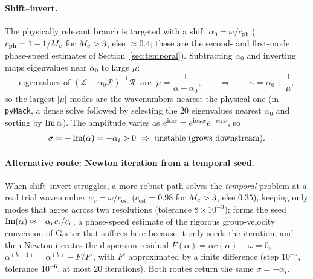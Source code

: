 \documentclass[11pt]{article}
\begin{document}
\paragraph{Shift--invert.} The physically relevant branch is targeted with a shift
$\alpha_0=\omega/c_{\mathrm{ph}}$ ($c_{\mathrm{ph}}=1-1/M_e$ for $M_e>3$, else $\approx0.4$;
these are the second- and first-mode phase-speed estimates of Section~\ref{sec:temporal}). Subtracting
$\alpha_0$ and inverting maps eigenvalues near $\alpha_0$ to large $\mu$:
\begin{equation}\label{eq:shift}
  \text{eigenvalues of }(\mathcal L-\alpha_0\mathcal R)^{-1}\mathcal R\ \text{ are }\ \mu=\frac1{\alpha-\alpha_0},
  \qquad\Rightarrow\qquad \alpha=\alpha_0+\frac1\mu ,
\end{equation}
so the largest-$|\mu|$ modes are the wavenumbers nearest the physical one (in \texttt{pyMack}, a
dense solve followed by selecting the $20$ eigenvalues nearest $\alpha_0$ and
sorting by $\operatorname{Im}\alpha$). The amplitude varies as
$e^{\mathrm{i}\alpha x}=e^{\mathrm{i}\alpha_rx}e^{-\alpha_ix}$, so
\begin{equation}\label{eq:sgrowth}
  \sigma=-\operatorname{Im}(\alpha)=-\alpha_i>0\ \Rightarrow\ \text{unstable (grows downstream)}.
\end{equation}

\paragraph{Alternative route: Newton iteration from a temporal seed.} When shift--invert struggles, a
more robust path solves the \emph{temporal} problem at a
real trial wavenumber $\alpha_r=\omega/c_{\mathrm{est}}$ ($c_{\mathrm{est}}=0.98$ for $M_e>3$, else
$0.35$), keeping only modes that agree across two resolutions (tolerance $8\times10^{-3}$); forms the
seed $\operatorname{Im}(\alpha)\approx-\alpha_rc_i/c_r$, a phase-speed estimate of the rigorous
group-velocity conversion of Gaster \cite{gaster1962} that suffices here because it only seeds the
iteration, and then Newton-iterates the dispersion residual $F(\alpha)=\alpha c(\alpha)-\omega=0$,
$\alpha^{(k+1)}=\alpha^{(k)}-F/F'$, with $F'$ approximated by a finite difference (step $10^{-5}$,
tolerance $10^{-6}$, at most $20$ iterations). Both routes return the same $\sigma=-\alpha_i$.
\end{document}
